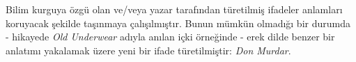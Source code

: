 Bilim kurguya özgü olan ve/veya yazar tarafından türetilmiş ifadeler anlamları
koruyacak şekilde taşınmaya çalışılmıştır. Bunun mümkün olmadığı bir durumda -
hikayede \emph{Old Underwear} adıyla anılan içki örneğinde - erek dilde benzer
bir anlatımı yakalamak üzere yeni bir ifade türetilmiştir: \emph{Don Murdar}.
